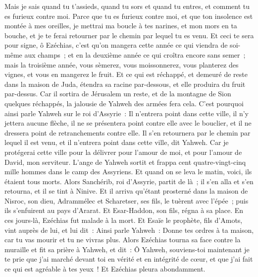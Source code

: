 \begin{multicols}{2}
Mais je sais quand tu t'assieds, quand tu sors et quand tu entres, et comment tu es furieux contre moi.
Parce que tu es furieux contre moi, et que ton insolence est montée à mes oreilles, je mettrai ma boucle à tes narines, et mon mors en ta bouche, et je te ferai retourner par le chemin par lequel tu es venu.
Et ceci te sera pour signe, ô Ezéchias, c'est qu'on mangera cette année ce qui viendra de soi-même aux champs~; et en la deuxième année ce qui croîtra encore sans semer~; mais la troisième année, vous sèmerez, vous moissonnerez, vous planterez des vignes, et vous en mangerez le fruit.
Et ce qui est réchappé, et demeuré de reste dans la maison de Juda, étendra sa racine par-dessous, et elle produira du fruit par-dessus.
Car il sortira de Jérusalem un reste, et de la montagne de Sion quelques réchappés, la jalousie de Yahweh des armées fera cela.
C'est pourquoi ainsi parle Yahweh sur le roi d'Assyrie~: Il n'entrera point dans cette ville, il n'y jettera aucune flèche, il ne se présentera point contre elle avec le bouclier, et il ne dressera point de retranchements contre elle.
Il s'en retournera par le chemin par lequel il est venu, et il n'entrera point dans cette ville, dit Yahweh.
Car je protégerai cette ville pour la délivrer pour l'amour de moi, et pour l'amour de David, mon serviteur.
L'ange de Yahweh sortit et frappa cent quatre-vingt-cinq mille hommes dans le camp des Assyriens. Et quand on se leva le matin, voici, ils étaient tous morts.
Alors Sanchérib, roi d'Assyrie, partit de là~; il s'en alla et s'en retourna, et il se tint à Ninive.
Et il arriva qu'étant prosterné dans la maison de Nisroc, son dieu, Adrammélec et Scharetser, ses fils, le tuèrent avec l'épée~; puis ils s'enfuirent au pays d'Ararat. Et Esar-Haddon, son fils, régna à sa place.
\VerseOne{}En ces jours-là, Ezéchias fut malade à la mort. Et Esaïe le prophète, fils d'Amots, vint auprès de lui, et lui dit~: Ainsi parle Yahweh~: Donne tes ordres à ta maison, car tu vas mourir et tu ne vivras plus.
Alors Ezéchias tourna sa face contre la muraille et fit sa prière à Yahweh,
et dit~: Ô Yahweh, souviens-toi maintenant je te prie que j'ai marché devant toi en vérité et en intégrité de cœur, et que j'ai fait ce qui est agréable à tes yeux~! Et Ezéchias pleura abondamment.

\end{multicols}
